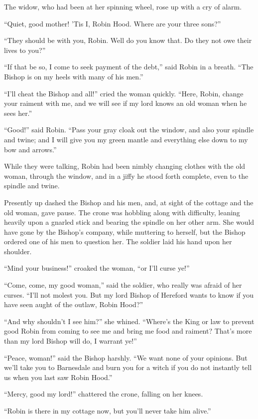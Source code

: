 The widow, who had been at her spinning wheel, rose up with a cry of
alarm.

``Quiet, good mother! 'Tis I, Robin Hood. Where are your three sons?''

``They should be with you, Robin. Well do you know that. Do they not owe
their lives to you?''

``If that be so, I come to seek payment of the debt,'' said Robin in a
breath. ``The Bishop is on my heels with many of his men.''

``I'll cheat the Bishop and all!'' cried the woman quickly. ``Here,
Robin, change your raiment with me, and we will see if my lord knows an
old woman when he sees her.''

``Good!'' said Robin. ``Pass your gray cloak out the window, and also
your spindle and twine; and I will give you my green mantle and
everything else down to my bow and arrows.''

While they were talking, Robin had been nimbly changing clothes with the
old woman, through the window, and in a jiffy he stood forth complete,
even to the spindle and twine.

Presently up dashed the Bishop and his men, and, at sight of the cottage
and the old woman, gave pause. The crone was hobbling along with
difficulty, leaning heavily upon a gnarled stick and bearing the spindle
on her other arm. She would have gone by the Bishop's company, while
muttering to herself, but the Bishop ordered one of his men to question
her. The soldier laid his hand upon her shoulder.

``Mind your business!'' croaked the woman, ``or I'll curse ye!''

``Come, come, my good woman,'' said the soldier, who really was afraid
of her curses. ``I'll not molest you. But my lord Bishop of Hereford
wants to know if you have seen aught of the outlaw, Robin Hood?''

``And why shouldn't I see him?'' she whined. ``Where's the King or law
to prevent good Robin from coming to see me and bring me food and
raiment? That's more than my lord Bishop will do, I warrant ye!''

``Peace, woman!'' said the Bishop harshly. ``We want none of your
opinions. But we'll take you to Barnesdale and burn you for a witch if
you do not instantly tell us when you last saw Robin Hood.''

``Mercy, good my lord!'' chattered the crone, falling on her knees.

``Robin is there in my cottage now, but you'll never take him alive.''

